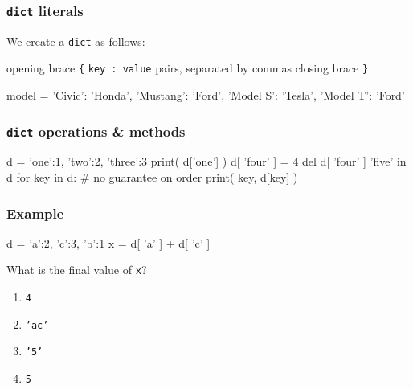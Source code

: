 \documentclass[11pt]{beamer}
\begin{document}
\begin{frame}[fragile]
  \frametitle{\texttt{dict} literals}
  \Enlarge

  \begin{itemize}
  \myitem  We create a \texttt{dict} as follows:
    \begin{itemize}
    \mysubitem  opening brace \texttt{\{}
    \mysubitem  \texttt{key : value} pairs, separated by commas
    \mysubitem  closing brace \texttt{\}}
    \end{itemize}
  \end{itemize}
  \begin{semiverbatim}
model = {
  'Civic': 'Honda',
  'Mustang': 'Ford',
  'Model S': 'Tesla',
  'Model T': 'Ford'
}
  \end{semiverbatim}
\end{frame}

\begin{frame}[fragile]
  \frametitle{\texttt{dict} operations \& methods}
  \Enlarge

  \begin{semiverbatim}
d = { 'one':1, 'two':2, 'three':3 }
print( d['one'] )
d[ 'four' ] = 4
del d[ 'four' ]
'five' in d
for key in d:  # no guarantee on order
    print( key, d[key] )
  \end{semiverbatim}
\end{frame}

\begin{frame}[fragile]
  \frametitle{Example}
  \Enlarge

  \begin{semiverbatim}
d = { 'a':2, 'c':3, 'b':1 }
x = d[ 'a' ] + d[ 'c' ]
  \end{semiverbatim}
  What is the final value of \texttt{x}?
  \begin{enumerate}[label=\Alph*]
  \item  \texttt{4}
  \item  \texttt{'ac'}
  \item  \texttt{'5'}
  \item  \texttt{5}
  \end{enumerate}
\end{frame}
\end{document}
